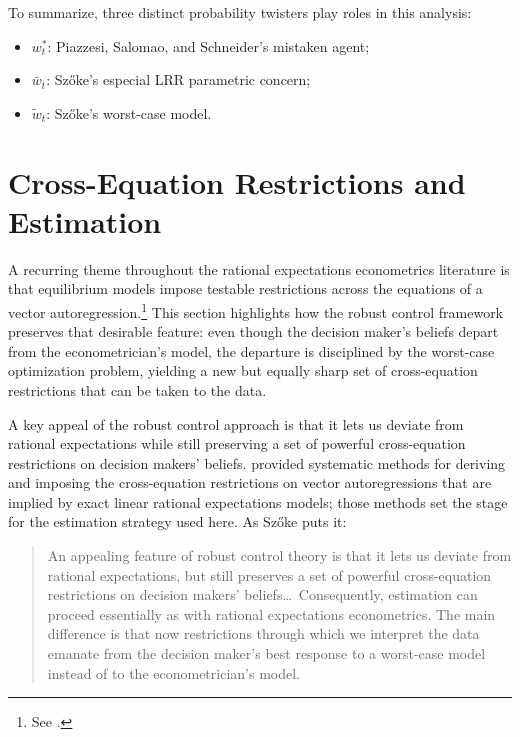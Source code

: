 \documentclass[12pt]{article}
\theoremstyle{definition}
\begin{document}
To summarize, three distinct probability twisters play roles in this
analysis:
\begin{itemize}
\item $w_t^*$: Piazzesi, Salomao, and Schneider's mistaken agent;
\item $\bar w_t$: Sz\H{o}ke's especial LRR parametric concern;
\item $\tilde w_t$: Sz\H{o}ke's worst-case model.
\end{itemize}


\section{Cross-Equation Restrictions and Estimation}
\label{sec:motivation}

A recurring theme throughout the rational expectations econometrics
literature is that equilibrium models impose testable restrictions across
the equations of a vector autoregression.\footnote{See \citet{LucasSargent1981}.}  
This section highlights how
the robust control framework preserves that desirable feature: even
though the decision maker's beliefs depart from the econometrician's
model, the departure is disciplined by the worst-case optimization
problem, yielding a new but equally sharp set of cross-equation
restrictions that can be taken to the data.

A key appeal of the robust control approach is that it lets us deviate
from rational expectations while still preserving a set of powerful
cross-equation restrictions on decision makers' beliefs.
\citet{HansenSargent1991} provided systematic methods for deriving and
imposing the cross-equation restrictions on vector autoregressions that
are implied by exact linear rational expectations models; those methods
set the stage for the estimation strategy used here.
As Sz\H{o}ke puts it:
\begin{quote}
An appealing feature of robust control theory is that it lets us deviate
from rational expectations, but still preserves a set of powerful
cross-equation restrictions on decision makers' beliefs\ldots\
Consequently, estimation can proceed essentially as with rational
expectations econometrics.  The main difference is that now restrictions
through which we interpret the data emanate from the decision maker's
best response to a worst-case model instead of to the econometrician's
model.
\end{quote}
\end{document}
